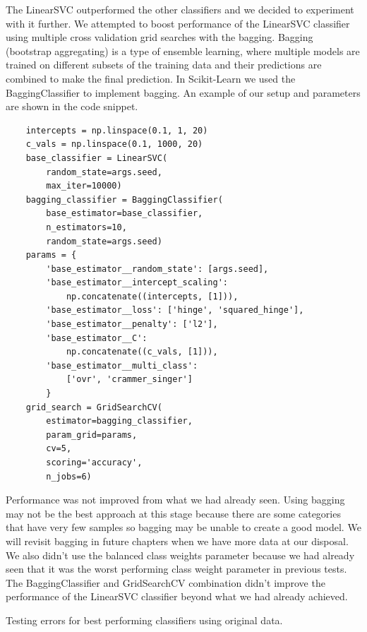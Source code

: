 The LinearSVC outperformed the other classifiers and we decided to experiment with it further. We attempted to boost performance of the LinearSVC classifier using multiple cross validation grid searches with the bagging. Bagging (bootstrap aggregating) is a type of ensemble learning, where multiple models are trained on different subsets of the training data and their predictions are combined to make the final prediction. In Scikit-Learn we used the BaggingClassifier to implement bagging. An example of our setup and parameters are shown in the code snippet. 

\begin{verbatim}
    intercepts = np.linspace(0.1, 1, 20)
    c_vals = np.linspace(0.1, 1000, 20)
    base_classifier = LinearSVC(
        random_state=args.seed, 
        max_iter=10000)
    bagging_classifier = BaggingClassifier(
        base_estimator=base_classifier, 
        n_estimators=10, 
        random_state=args.seed)
    params = {
        'base_estimator__random_state': [args.seed],
        'base_estimator__intercept_scaling': 
            np.concatenate((intercepts, [1])),
        'base_estimator__loss': ['hinge', 'squared_hinge'],
        'base_estimator__penalty': ['l2'],
        'base_estimator__C': 
            np.concatenate((c_vals, [1])),
        'base_estimator__multi_class': 
            ['ovr', 'crammer_singer']
        }
    grid_search = GridSearchCV(
        estimator=bagging_classifier, 
        param_grid=params, 
        cv=5,
        scoring='accuracy',
        n_jobs=6)
\end{verbatim}

Performance was not improved from what we had already seen. Using bagging may not be the best approach at this stage because there are some categories that have very few samples so bagging may be unable to create a good model. We will revisit bagging in future chapters when we have more data at our disposal. We also didn't use the balanced class weights parameter because we had already seen that it was the worst performing class weight parameter in previous tests. The BaggingClassifier and GridSearchCV combination didn't improve the performance of the LinearSVC classifier beyond what we had already achieved.

\begin{table}[ht]
\centering
\caption{Testing errors for best performing classifiers using original data.}

\label{tab:best_errors}
\end{table}

